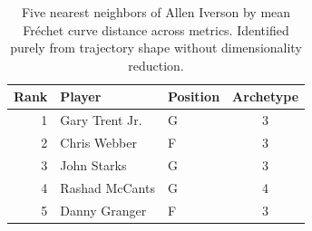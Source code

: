 \begin{table}[htbp]
  \centering\small
  \begin{tabular}{rllc}
    \toprule
    Rank & Player & Position & Archetype \\
    \midrule
    1 & Gary Trent Jr. & G & 3 \\
    2 & Chris Webber & F & 3 \\
    3 & John Starks & G & 3 \\
    4 & Rashad McCants & G & 4 \\
    5 & Danny Granger & F & 3 \\
    \bottomrule
  \end{tabular}
  \caption{Five nearest neighbors of Allen Iverson by mean Fr\'{e}chet curve distance across metrics. Identified purely from trajectory shape without dimensionality reduction.}
  \label{tab:Allen_Iverson_frechet_curve_neighbors}
\end{table}

